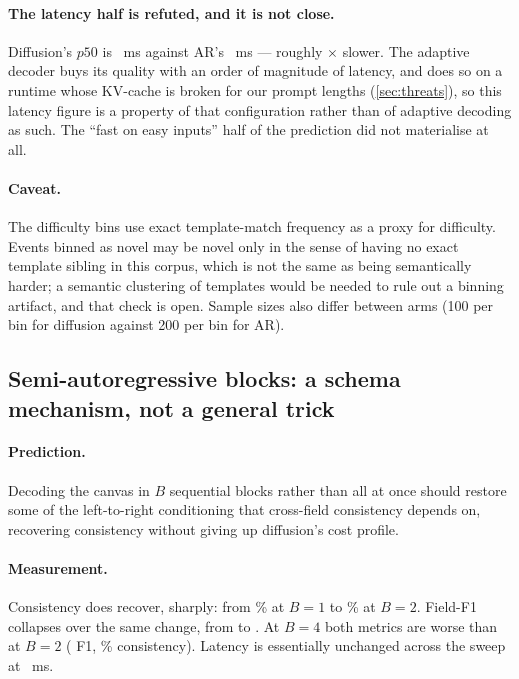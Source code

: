 \paragraph{The latency half is refuted, and it is not close.} Diffusion's $p50$
is \adaptDMPFifty~ms against AR's \adaptARPFifty~ms --- roughly
$\times$ slower. The adaptive decoder buys its quality
with an order of magnitude of latency, and does so on a runtime whose KV-cache
is broken for our prompt lengths (\cref{sec:threats}), so this latency figure is
a property of that configuration rather than of adaptive decoding as such. The
``fast on easy inputs'' half of the prediction did not materialise at all.

\paragraph{Caveat.} The difficulty bins use exact template-match frequency as a
proxy for difficulty. Events binned as novel may be novel only in the sense of
having no exact template sibling in this corpus, which is not the same as being
semantically harder; a semantic clustering of templates would be needed to rule
out a binning artifact, and that check is open. Sample sizes also differ between
arms (100 per bin for diffusion against 200 per bin for AR).

\subsection{Semi-autoregressive blocks: a schema mechanism, not a general trick}
\label{sec:neg-semiar}

\paragraph{Prediction.} Decoding the canvas in $B$ sequential blocks rather than
all at once should restore some of the left-to-right conditioning that
cross-field consistency depends on, recovering consistency without giving up
diffusion's cost profile.

\paragraph{Measurement.} Consistency does recover, sharply: from
\semiARConsistBOne\% at $B=1$ to \semiARConsistBTwo\% at $B=2$. Field-F1
collapses over the same change, from \semiARFOneBOne{} to \semiARFOneBTwo. At
$B=4$ both metrics are worse than at $B=2$ ( F1,
\% consistency). Latency is essentially unchanged
across the sweep at ~ms.

